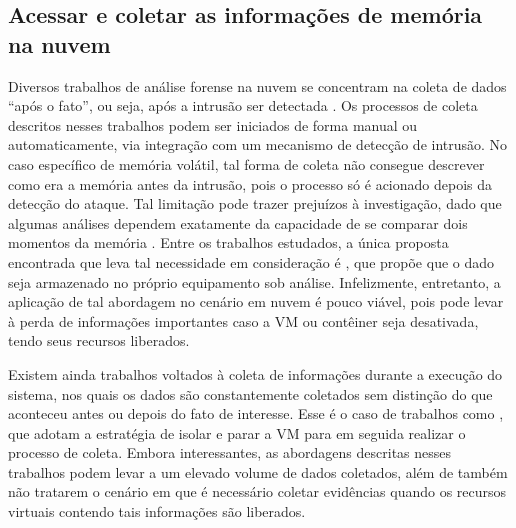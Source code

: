 \documentclass[conference]{IEEEtran}
\begin{document}
\subsection{Acessar e coletar as informações de memória na nuvem}

Diversos trabalhos de análise forense na nuvem se concentram na coleta de dados ``após o fato'', ou seja, após a intrusão ser detectada \cite{Reichert_Auto_acquisition:2015,Poisel_VMI:2013,Dykstra_FROST:2013,George_DF2CE:2012,Sang_Log_approach:2013}. 
%
Os processos de coleta descritos nesses trabalhos podem ser iniciados de forma manual ou automaticamente, via integração com um mecanismo de detecção de intrusão. 
%
No caso específico de memória volátil, tal forma de coleta não consegue descrever como era a memória antes da intrusão, pois o processo só é acionado depois da detecção do ataque. 
%
Tal limitação pode trazer prejuízos à investigação, dado que algumas análises dependem exatamente da capacidade de se comparar dois momentos da memória \cite{Case_Memory_Forensics:2014}. 
%
Entre os trabalhos estudados, a única proposta encontrada que leva tal necessidade em consideração é \cite{Dezfouli_Backup_approach:2012}, que propõe que o dado seja armazenado no próprio equipamento sob análise.
%
Infelizmente, entretanto, a aplicação de tal abordagem no cenário em nuvem é pouco viável, pois pode levar à perda de informações importantes caso a VM ou contêiner seja desativada, tendo seus recursos liberados.
%

Existem ainda trabalhos voltados à coleta de informações durante a execução do sistema, nos quais os dados são constantemente coletados sem distinção do que aconteceu antes ou depois do fato de interesse.
%
Esse é o caso de trabalhos como \cite{Poisel_VMI:2013,Dykstra_FROST:2013,Sang_Log_approach:2013}, que adotam a estratégia de isolar e parar a VM para em seguida realizar o processo de coleta. 
%
Embora interessantes, as abordagens descritas nesses trabalhos podem levar a um elevado volume de dados coletados, além de também não tratarem o cenário em que é necessário coletar evidências quando os recursos virtuais contendo tais informações são liberados.
\end{document}
